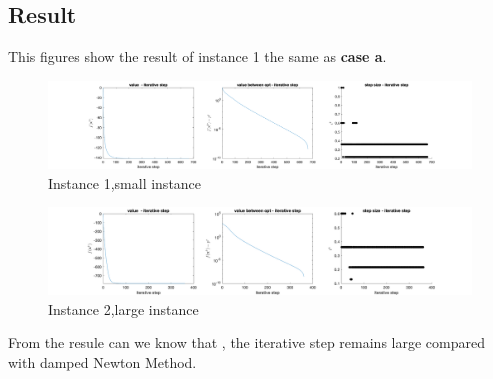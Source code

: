 \documentclass[]{article}
\begin{document}
\subsection{Result}
\par This figures show the result of instance 1 the same as\textbf{ case  a}.

\begin{figure}[H]
	\centering
	\includegraphics[width=350pt,keepaspectratio]{dntapp2_small_normal}
	\caption{Instance 1,small instance}
\end{figure}

\begin{figure}[H]
	\centering
	\includegraphics[width=350pt,keepaspectratio]{dntapp2_large_normal}
	\caption{Instance 2,large instance}
\end{figure}
 From the resule can we know that , the iterative step remains large compared with damped Newton Method.
\end{document}
